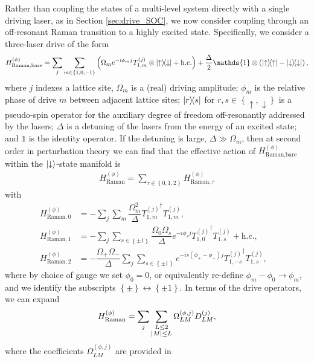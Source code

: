 \documentclass[nofootinbib,notitlepage,11pt]{revtex4-2}
\renewcommand{\t}{\text} %
\newcommand{\f}[2]{\dfrac{#1}{#2}} %
\newcommand{\p}[1]{\left(#1\right)} %
\renewcommand{\set}[1]{\left\{#1\right\}} %
\newcommand{\1}{\mathds{1}}
\newcommand{\up}{\uparrow}
\newcommand{\dn}{\downarrow}
\begin{document}
Rather than coupling the states of a multi-level system directly with
a single driving laser, as in Section \ref{sec:drive_SOC}, we now
consider coupling through an off-resonant Raman transition to a highly
excited state.  Specifically, we consider a three-laser drive of the
form
\begin{align}
  H_{\t{Raman,bare}}^{(\phi)}
  = \sum_j \sum_{m\in\set{1,0,-1}} \p{\Omega_m e^{-i\phi_m j}
    T_{1,m}^{(j)} \otimes \op{\up}{\dn} + \t{h.c.}}
  + \f{\Delta}{2} \1 \otimes \p{\op{\up} - \op{\dn}},
  \label{eq:raman_bare}
\end{align}
where $j$ indexes a lattice site, $\Omega_m$ is a (real) driving
amplitude; $\phi_m$ is the relative phase of drive $m$ between
adjacent lattice sites; $\op{r}{s}$ for $r,s\in\set{\up,\dn}$ is a
pseudo-spin operator for the auxiliary degree of freedom
off-resonantly addressed by the lasers; $\Delta$ is a detuning of the
lasers from the energy of an excited state; and $\1$ is the identity
operator.  If the detuning is large, $\Delta\gg\Omega_m$, then at
second order in perturbation theory we can find that the effective
action of $H_{\t{Raman,bare}}^{(\phi)}$ within the $\ket{\dn}$-state
manifold is
\begin{align}
  H_{\t{Raman}}^{(\phi)}
  = \sum_{\tau\in\set{0,1,2}} H_{\t{Raman},\tau}^{(\phi)}
\end{align}
with
\begin{align}
  H_{\t{Raman},0}^{(\phi)}
  &= -\sum_j\sum_m \f{\Omega_m^2}{\Delta}
  {T_{1,m}^{(j)}}^\dag T_{1,m}^{(j)}, & \label{eq:raman_0} \\
  H_{\t{Raman},1}^{(\phi)}
  &= -\sum_j\sum_{s\in\set{\pm1}}
  \f{\Omega_0\Omega_s}{\Delta} e^{-i\phi_s j}
  {T_{1,0}^{(j)}}^\dag T_{1,s}^{(j)} + \t{h.c.},
  \\
  H_{\t{Raman},2}^{(\phi)}
  &= -\f{\Omega_+\Omega_-}{\Delta}
  \sum_j\sum_{s\in\set{\pm1}} e^{-is\p{\phi_+-\phi_-}j}
  {T_{1,-s}^{(j)}}^\dag T_{1,s}^{(j)},
  \label{eq:raman_2}
\end{align}
where by choice of gauge we set $\phi_0=0$, or equivalently re-define
$\phi_m-\phi_0\to\phi_m$, and we identify the subscripts
$\set{\pm}\leftrightarrow\set{\pm1}$.  In terms of the drive
operators, we can expand
\begin{align}
  H_{\t{Raman}}^{(\phi)}
  = \sum_j \sum_{\substack{L\le2\\\abs{M}\le L}}
  \Omega_{LM}^{(\phi,j)} D_{LM}^{(j)},
  \label{eq:raman_drive}
\end{align}
where the coefficients $\Omega_{LM}^{(\phi,j)}$ are provided in
\end{document}
